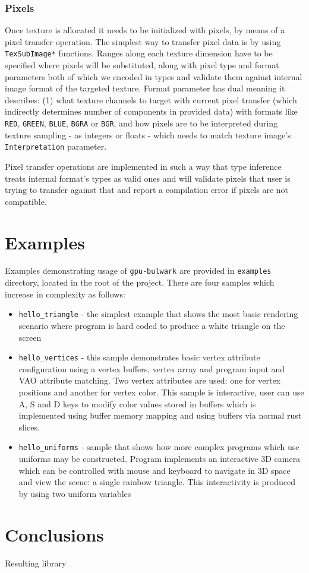 \subsubsection{Pixels}

Once texture is allocated it needs to be initialized with pixels, by means of a pixel transfer operation.
The simplest way to transfer pixel data is by using \texttt{TexSubImage*} functions.
Ranges along each texture dimension have to be specified where pixels will be substituted,
along with pixel type and format parameters both of which we encoded in types and validate them 
against internal image format of the targeted texture.
Format parameter has dual meaning it describes: (1) what texture channels to target with current pixel transfer
(which indirectly determines number of components in provided data) with formats like \texttt{RED}, \texttt{GREEN}, \texttt{BLUE},
\texttt{BGRA} or \texttt{BGR}, and how pixels are to be interpreted during texture sampling - as integers or floats - which needs to match
texture image's \texttt{Interpretation} parameter.

Pixel transfer operations are implemented in such a way that type inference treats internal format's types
as valid ones and will validate pixels that user is trying to transfer against that and report a compilation error
if pixels are not compatible.

\section{Examples}

Examples demonstrating usage of \texttt{gpu-bulwark} are provided in \texttt{examples} directory, located in the root of the project.
There are four samples which increase in complexity as follows:
\begin{itemize}
    \item \texttt{hello\_triangle} - the simplest example that shows the most basic rendering scenario where program is hard coded to produce a white
        triangle on the screen
    \item \texttt{hello\_vertices} - this sample demonstrates basic vertex attribute configuration using a vertex buffers, 
        vertex array and program input and VAO attribute matching. 
        Two vertex attributes are used: one for vertex positions and another for vertex color.
        This sample is interactive, user can use A, S and D keys to modify color values stored in buffers 
        which is implemented using buffer memory mapping and using buffers via normal rust slices.
    \item \texttt{hello\_uniforms} - sample that shows how more complex programs which use uniforms may be constructed.
        Program implements an interactive 3D camera which can be controlled with mouse and keyboard to navigate in 3D space and
        view the scene: a single rainbow triangle. This interactivity is produced by using two uniform variables 
\end{itemize}

\section{Conclusions}

Resulting library 
